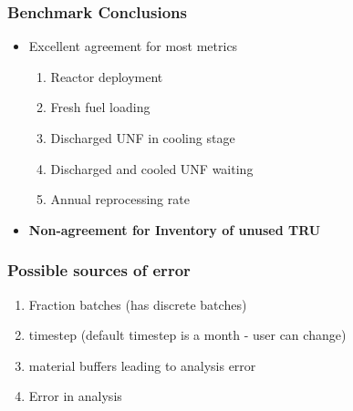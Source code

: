 \begin{frame}
    \frametitle{Benchmark Conclusions}
    \begin{itemize}
        \item Excellent agreement for most metrics
            \begin{enumerate}
                \item Reactor deployment
                \item Fresh fuel loading
                \item Discharged UNF in cooling stage
                \item Discharged and cooled UNF waiting
                \item Annual reprocessing rate
            \end{enumerate}
        \item \textbf{Non-agreement for Inventory of unused TRU}
    \end{itemize}
\end{frame}


\begin{frame}
    \frametitle{Possible sources of error}
    \begin{enumerate}
        \item Fraction batches (\Cyclus has discrete batches)
        \item timestep (\Cyclus default timestep is a month - user can change)
        \item \Cyclus material buffers leading to analysis error
        \item Error in analysis
    \end{enumerate}
\end{frame}